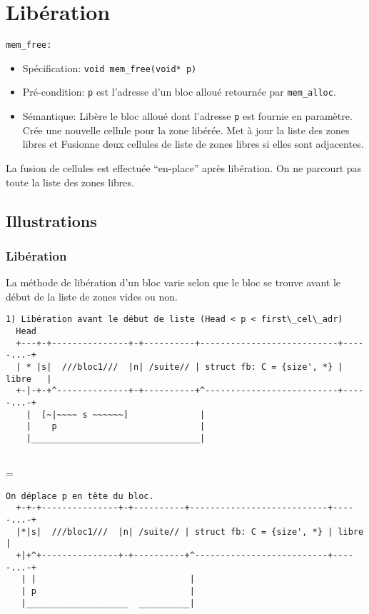 \documentclass[11pt]{article}
\newenvironment{absolutelynopagebreak}
  {\par\nobreak\vfil\penalty0\vfilneg
   \vtop\bgroup}
  {\par\xdef\tpd{\the\prevdepth}\egroup
   \prevdepth=\tpd}
\theoremstyle{definition}
\begin{document}
\section{Libération}
\texttt{mem\_free:}
\begin{itemize}
\item[] Spécification: \texttt{void mem\_free(void* p)}
\item[] Pré-condition: \texttt{p} est l'adresse d'un bloc alloué retournée par \texttt{mem\_alloc}.
\item[] Sémantique: Libère le bloc alloué dont l'adresse \texttt{p} est fournie en paramètre.
  Crée une nouvelle cellule pour la zone libérée. Met à jour la liste des zones libres et Fusionne deux cellules de liste de zones libres si elles sont adjacentes.
\end{itemize}

La fusion de cellules est effectuée ``en-place'' après libération. On ne parcourt pas toute la liste des zones libres.
\subsection{Illustrations}
\subsubsection{Libération}
  La méthode de libération d'un bloc varie selon que le bloc se trouve avant le début de la liste de zones vides ou non.
\begin{absolutelynopagebreak}
\begin{lstlisting}[columns=fixed,basicstyle=\scriptsize\ttfamily]
  1) Libération avant le début de liste (Head < p < first\_cel\_adr)
  Head
  +---+-+---------------+-+----------+---------------------------+-----...-+
  | * |s|  ///bloc1///  |n| /suite// | struct fb: C = {size', *} | libre   |
  +-|-+-+^--------------+-+----------+^--------------------------+-----...-+
    |  [~|~~~~ s ~~~~~~]              |
    |    p                            |
    |_________________________________|
    
\end{lstlisting}
\end{absolutelynopagebreak}

\begin{lstlisting}[columns=fixed,basicstyle=\scriptsize\ttfamily]
  On déplace p en tête du bloc.
  +-+-+---------------+-+----------+---------------------------+-----...-+
  |*|s|  ///bloc1///  |n| /suite// | struct fb: C = {size', *} | libre   |
  +|+^+---------------+-+----------+^--------------------------+-----...-+
   | |                              |
   | p                              |
   |____________________  __________|
\end{lstlisting}
\end{document}

